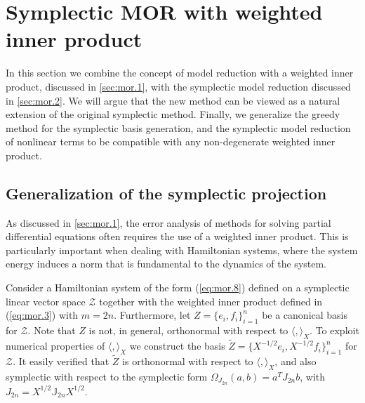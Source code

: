 \section{Symplectic MOR with weighted inner product} \label{sec:normmor}

In this section we combine the concept of model reduction with a weighted inner product, discussed in \cref{sec:mor.1}, with the symplectic model reduction discussed in \cref{sec:mor.2}. We will argue that the new method can be viewed as a natural extension of the original symplectic method. Finally, we generalize the greedy method for the symplectic basis generation, and the symplectic model reduction of nonlinear terms to be compatible with any non-degenerate weighted inner product.

\subsection{Generalization of the symplectic projection} \label{sec:normmor.1}
As discussed in \cref{sec:mor.1}, the error analysis of methods for solving partial differential equations often requires the use of a weighted inner product. This is particularly important when dealing with Hamiltonian systems, where the system energy induces a norm that is fundamental to the dynamics of the system.
   
Consider a Hamiltonian system of the form (\ref{eq:mor.8}) defined on a symplectic linear vector space $\mathcal Z$ together with the weighted inner product defined in (\ref{eq:mor.3}) with $m=2n$. Furthermore, let $Z = \{ e_i,f_i \}_{i=1}^n$ be a canonical basis for $\mathcal Z$. Note that $Z$ is not, in general, orthonormal with respect to $\langle,\rangle_X$. To exploit numerical properties of $\langle,\rangle_X$ we construct the basis $\tilde Z = \{ X^{-1/2}e_i,X^{-1/2}f_i \}_{i=1}^{n}$ for $\mathcal Z$. It easily verified that $\tilde Z$ is orthonormal with respect to $\langle,\rangle_X$, and also symplectic with respect to the symplectic form $\Omega_{J_{2n}}(a,b) = a^T J_{2n} b $, with $J_{2n} = X^{1/2} \mathbb J_{2n}X^{1/2}$. 

